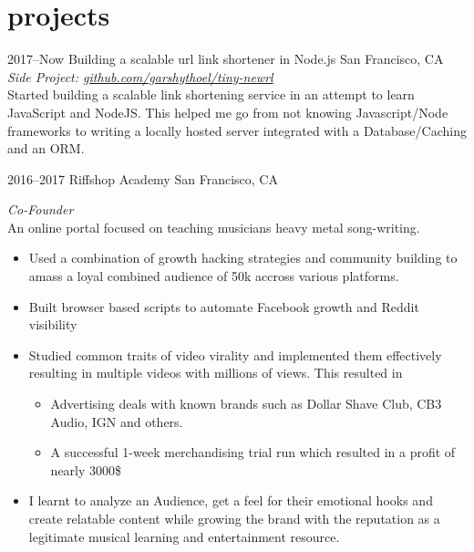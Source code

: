 \documentclass[print]{friggeri-cv} %
\begin{document}

\section{projects}
\begin{entrylist}

\entry
{2017--Now}
{Building a scalable url link shortener in Node.js}
{San Francisco, CA}
{ \emph{Side Project: \href{https://github.com/garshythoel/tiny-newrl}{github.com/garshythoel/tiny-newrl}} \\
Started building a scalable link shortening service in an attempt to learn JavaScript and NodeJS. This helped me go from not knowing Javascript/Node frameworks to writing a locally hosted server integrated with a Database/Caching and an ORM.}

\entry
{2016--2017}
{Riffshop Academy}
{San Francisco, CA}
{ \emph{Co-Founder} \\
An online portal focused on teaching musicians heavy metal song-writing.
\begin{itemize}
\item Used a combination of growth hacking strategies and community building to amass a loyal combined audience of 50k accross various platforms.
\item Built browser based scripts to automate Facebook growth and Reddit visibility
\item Studied common traits of video virality and implemented them effectively
resulting in multiple videos with millions of views. This resulted in
\begin{itemize}
\item Advertising deals with known brands such as Dollar Shave Club, CB3 Audio, IGN and others.
\item A successful 1-week merchandising trial run which resulted in a profit of nearly 3000\$
\end{itemize}
\item I learnt to analyze an Audience, get a feel for their emotional hooks and
create relatable content while growing the brand with the reputation as a legitimate musical learning and entertainment resource.
\end{itemize}}


\end{entrylist}
\end{document}

